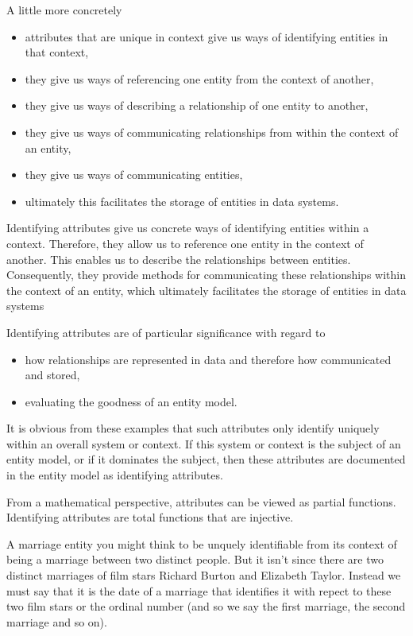 \mynote A little more concretely 
\begin{itemize}
\item attributes that are unique in context give us ways of identifying entities in that context, 
\item they give us ways of referencing one entity from the context of another, 
\item they give us ways of describing a relationship of one entity to another,
\item they give us ways of communicating relationships from within the context of an entity,
\item they give us ways of communicating entities, 
\item ultimately this facilitates the storage of entities in data systems. 
\end{itemize}

\mynote
Identifying attributes give us concrete ways of identifying entities within a context. Therefore, they allow us to reference one entity in the context of another. This enables us to describe the relationships between entities. Consequently, they provide methods for communicating these relationships within the context of an entity, which ultimately facilitates the storage of entities in data systems

\mynote Identifying attributes are of particular significance with regard to 
\begin{itemize}
	\item how relationships are represented in data and therefore how communicated and stored,
	\item evaluating the goodness of an entity model.
\end{itemize}  

\mynote
It is obvious from these examples that such attributes only identify uniquely within an overall system or context. If this system or context is the subject of an entity model, or if it dominates the subject, then these attributes are documented in the entity model as identifying attributes. 

\mynote From a mathematical perspective, attributes can be viewed as partial functions. Identifying attributes are total functions that are injective.  

\mynote
A marriage entity you might think to be unquely identifiable from its context of being a marriage between two distinct people. But it isn't since there are two distinct marriages of film stars Richard Burton and Elizabeth Taylor. Instead we must say that it is the date of a marriage that identifies it with repect to these two film stars or the ordinal number (and so we say the first marriage, the second marriage and so on).

